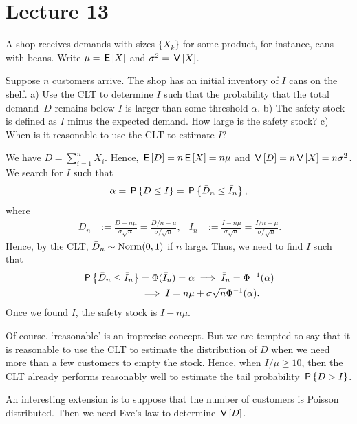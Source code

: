 \documentclass[lectures]{subfiles}
\begin{document}
\section{Lecture 13}
\label{sec:lecture-13}



\begin{exercise}
A shop receives demands with sizes $\{X_{k}\}$ for some product, for instance, cans with beans.
Write $\mu = \E X$ and $\sigma^{2} = \V X$.

Suppose $n$ customers arrive.
The shop has an initial inventory of $I$ cans on the shelf.
a) Use the CLT to determine $I$ such that the probability that the total demand~$D$ remains below $I$ is larger than some threshold $\alpha$.
b) The safety stock is defined as $I$ minus the expected demand.
How large is the safety stock?
c) When is it reasonable to use the CLT to estimate $I$?
\begin{solution}
We have $D=\sum_{i=1}^{n} X_{i}$. Hence, $\E D = n \E X = n \mu$ and $\V D = n \V X = n \sigma^{2}$. We search for $I$ such that
\begin{equation}
  \label{eq:1}
\alpha = \P{D \leq I}   = \P{\bar D_n \leq \bar I_{n}},
\end{equation}
where
\begin{align}
  \label{eq:2}\
\bar D_{n} &:= \frac{D-n\mu}{\sigma \sqrt n}   = \frac{D/n - \mu}{\sigma/\sqrt n}, &
\bar I_{n} &:= \frac{I-n\mu}{\sigma \sqrt n}   = \frac{I/n - \mu}{\sigma/\sqrt n}.
\end{align}
Hence, by the CLT, $\bar D_{n}\sim \Norm{0, 1}$ if $n$ large. Thus, we need to find $I$ such that
\begin{align}
\P{\bar D_{n} \leq \bar I_{n}} &= \Phi(\bar I_{n}) = \alpha \implies \bar I_{n} = \Phi^{-1}(\alpha) \\
&\implies  I = n\mu + \sigma \sqrt n \Phi^{-1}(\alpha).
\end{align}
Once we found $I$, the safety stock is $I-n\mu$.

Of course, `reasonable' is an imprecise concept.
But we are tempted to say that it is reasonable to use the CLT to estimate the distribution of $D$ when we need more than a few customers to empty the stock.
Hence, when $I/\mu \geq 10$, then the CLT already performs reasonably well to estimate the tail probability $\P{D>I}$.

An interesting extension is to suppose that the number of customers is Poisson distributed. Then we need Eve's law to determine $\V D$.

\end{solution}
\end{exercise}
\end{document}
